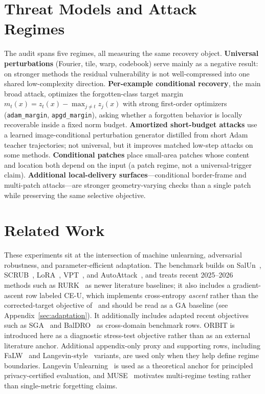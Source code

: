 \documentclass{article}
\begin{document}
\section{Threat Models and Attack Regimes}
The audit spans five regimes, all measuring the same recovery object. \textbf{Universal perturbations} (Fourier, tile, warp, codebook) serve mainly as a negative result: on stronger methods the residual vulnerability is not well-compressed into one shared low-complexity direction. \textbf{Per-example conditional recovery}, the main broad attack, optimizes the forgotten-class target margin $m_t(x) = z_t(x) - \max_{j \neq t} z_j(x)$ with strong first-order optimizers (\texttt{adam\_margin}, \texttt{apgd\_margin}), asking whether a forgotten behavior is locally recoverable inside a fixed norm budget. \textbf{Amortized short-budget attacks} use a learned image-conditional perturbation generator distilled from short Adam teacher trajectories; not universal, but it improves matched low-step attacks on some methods. \textbf{Conditional patches} place small-area patches whose content and location both depend on the input (a patch regime, not a universal-trigger claim). \textbf{Additional local-delivery surfaces}---conditional border-frame and multi-patch attacks---are stronger geometry-varying checks than a single patch while preserving the same selective objective.



\section{Related Work}
These experiments sit at the intersection of machine unlearning, adversarial robustness, and parameter-efficient adaptation. The benchmark builds on SalUn~\cite{fan2024salun}, SCRUB~\cite{kurmanji2023scrub}, LoRA~\cite{hu2022lora}, VPT~\cite{jia2022vpt}, and AutoAttack~\cite{croce2020autoattack}, and treats recent 2025--2026 methods such as RURK~\cite{hsu2025rurk} as newer literature baselines; it also includes a gradient-ascent row labeled CE-U, which implements cross-entropy \emph{ascent} rather than the corrected-target objective of~\cite{yang2025ceu} and should be read as a GA baseline (see Appendix~\ref{sec:adaptation}). It additionally includes adapted recent objectives such as SGA~\cite{pang2025sga} and BalDRO~\cite{shao2026baldro} as cross-domain benchmark rows. ORBIT is introduced here as a diagnostic stress-test objective rather than as an external literature anchor. Additional appendix-only proxy and supporting rows, including FaLW~\cite{yu2026falw} and Langevin-style~\cite{chien2024langevin} variants, are used only when they help define regime boundaries. Langevin Unlearning~\cite{chien2024langevin} is used as a theoretical anchor for principled privacy-certified evaluation, and MUSE~\cite{shi2024muse} motivates multi-regime testing rather than single-metric forgetting claims.
\end{document}

